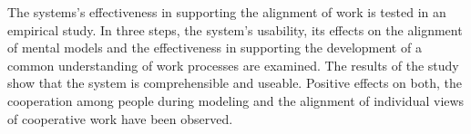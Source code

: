 The systems's effectiveness in supporting the alignment of work is tested in an empirical study. In three steps, the system's usability, its effects on the alignment of mental models and the effectiveness in supporting the development of a common understanding of work processes are examined. The results of the study show that the system is comprehensible and useable. Positive effects on both, the cooperation among people during modeling and the alignment of individual views of cooperative work have been observed.
